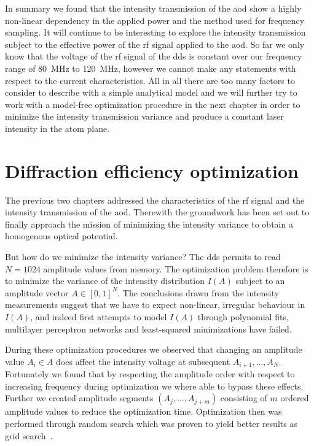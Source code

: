 In summary we found that the intensity transmission of the \gls{aod} show a
highly non-linear dependency in the applied power and the method used for
frequency sampling. It will continue to be interesting to explore the
intensity transmission subject to the effective power of the \gls{rf} signal
applied to the \gls{aod}. So far we only know that the voltage of the \gls{rf}
signal of the \gls{dds} is constant over our frequency range of
\SI{80}{\mega\hertz} to \SI{120}{\mega\hertz}, however we cannot make any
statements with respect to the current characteristics. All in all there are
too many factors to consider to describe with a simple analytical model and we
will further try to work with a model-free optimization procedure in the next
chapter in order to minimize the intensity transmission variance and produce
a constant laser intensity in the atom plane.

\section{Diffraction efficiency optimization}

The previous two chapters addressed the characteristics of the \gls{rf}
signal and the intensity transmission of the \gls{aod}. Therewith the
groundwork has been set out to finally approach the mission of minimizing the
intensity variance to obtain a homogenous optical potential.

But how do we minimize the intensity variance? The \gls{dds} permits to read
$N=1024$ amplitude values from memory. The optimization problem therefore is to
minimize the variance of the intensity distribution $I(A)$ subject to an
amplitude vector $A\in{[0,1]}^N$. The conclusions drawn from the intensity
measurements suggest that we have to expect non-linear, irregular behaviour
in $I(A)$, and indeed first attempts to model $I(A)$ through polynomial fits,
multilayer perceptron networks and least-squared minimizations have failed.

During these optimization procedures we observed that changing an amplitude
value $A_i\in A$ does affect the intensity voltage at subsequent
$A_{i+1},\dots,A_N$. Fortunately we found that by respecting the amplitude
order with respect to increasing frequency during optimization we where able
to bypass these effects. Further we created amplitude segments
$\left(A_j,\dots,A_{j+m}\right)$ consisting of $m$ ordered amplitude values
to reduce the optimization time. Optimization then was performed through
random search which was proven to yield better results as grid
search~\cite{Bergstra2012}.


